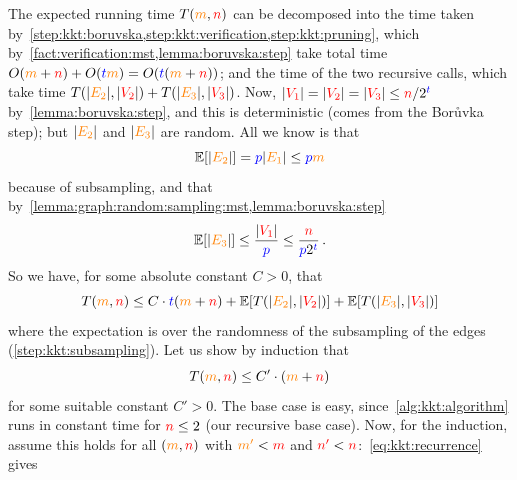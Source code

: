 The expected running time $T(\textcolor{orange}{m},\textcolor{red}{n})$ can be decomposed into the time taken by~\cref{step:kkt:boruvska,step:kkt:verification,step:kkt:pruning}, which by~\cref{fact:verification:mst,lemma:boruvska:step} take total time $O(\textcolor{orange}{m}+\textcolor{red}{n})+O(\textcolor{blue}{t}\textcolor{orange}{m}) = O(\textcolor{blue}{t}(\textcolor{orange}{m}+\textcolor{red}{n}))$; and the time of the two recursive calls, which take time $T(|\textcolor{orange}{E_2}|, |\textcolor{red}{V_2}|) + T(|\textcolor{orange}{E_3}|, |\textcolor{red}{V_3}|)$. Now, $|\textcolor{red}{V_1}|=|\textcolor{red}{V_2}|=|\textcolor{red}{V_3}| \leq {\textcolor{red}{n}}/2^{\textcolor{blue}{t}}$ by~\cref{lemma:boruvska:step}, and this is deterministic (comes from the Bor\r{u}vka step); but $|\textcolor{orange}{E_2}|$ and $|\textcolor{orange}{E_3}|$ are random. All we know is that 
\begin{equation}
\label{eq:kkt:bound:expect:E2}
\expect{|\orange{E_2}|}=\blue{p}|\orange{E_1}| \leq \blue{p}\orange{m}
\end{equation}
because of subsampling, and that by~\cref{lemma:graph:random:sampling:mst,lemma:boruvska:step}
\begin{equation}
\label{eq:kkt:bound:expect:E3}
\expect{|\orange{E_3}|} \leq \frac{|\red{V_1}|}{\blue{p}} \leq \frac{\ns}{\blue{p}2^{\blue{t}}}\,.
\end{equation}
So we have, for some absolute constant $C>0$, that
\begin{equation}
    \label{eq:kkt:recurrence}
T(\orange{m},\red{n}) \leq C\cdot \blue{t}(\orange{m}+\red{n})
+ \expect{T(|\orange{E_2}|, |\red{V_2}|)} + \expect{T(|\orange{E_3}|, |\red{V_3}|)}
\end{equation}
where the expectation is over the randomness of the subsampling of the edges (\cref{step:kkt:subsampling}). Let us show by induction that
\[
    T(\textcolor{orange}{m},\textcolor{red}{n}) \leq C'\cdot (\textcolor{orange}{m}+\textcolor{red}{n})
\]
for some suitable constant $C'>0$. The base case is easy, since~\cref{alg:kkt:algorithm} runs in constant time for $\textcolor{red}{n} \leq 2$ (our recursive base case). Now, for the induction, assume this holds for all $(\textcolor{orange}{m},\textcolor{red}{n})$ with $\textcolor{orange}{m'} < \textcolor{red}{m}$ and $\textcolor{red}{n'} < \textcolor{red}{n}$:~\cref{eq:kkt:recurrence} gives

